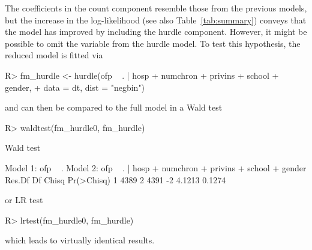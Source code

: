 \documentclass{Z}
\begin{document}
The coefficients in the count component resemble those from the previous
models, but the increase in the log-likelihood (see also Table~\ref{tab:summary})
conveys that the model has improved by including the hurdle component.
However, it might be possible to omit the  variable from
the hurdle model. To test this hypothesis, the reduced model is fitted
via
\begin{Schunk}
\begin{Sinput}
R> fm_hurdle <- hurdle(ofp ~ . | hosp + numchron + privins + school + gender,
+   data = dt, dist = "negbin")
\end{Sinput}
\end{Schunk}
and can then be compared to the full model in a Wald test
\begin{Schunk}
\begin{Sinput}
R> waldtest(fm_hurdle0, fm_hurdle)
\end{Sinput}
\begin{Soutput}
Wald test

Model 1: ofp ~ .
Model 2: ofp ~ . | hosp + numchron + privins + school + gender
  Res.Df   Df  Chisq Pr(>Chisq)
1   4389                       
2   4391   -2 4.1213     0.1274
\end{Soutput}
\end{Schunk}
or LR test
\begin{Schunk}
\begin{Sinput}
R> lrtest(fm_hurdle0, fm_hurdle)
\end{Sinput}
\end{Schunk}
which leads to virtually identical results.
\end{document}
